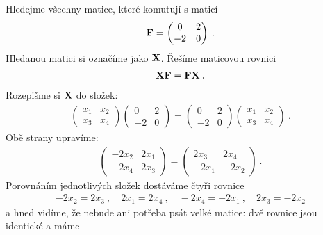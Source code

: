 \begin{example}
    Hledejme všechny matice, které komutují s maticí \begin{align}
        \mathbf{F} = \begin{pmatrix}
            0 & 2 \\ -2 & 0
        \end{pmatrix} \:.
    \end{align}
    Hledanou matici si označíme jako $\mathbf{X}$. Řešíme maticovou rovnici
    \begin{align}
        \mathbf{X} \mathbf{F} = \mathbf{F} \mathbf{X} \:.
    \end{align}
    Rozepišme si $\mathbf{X}$ do složek:
    \begin{align}
        \begin{pmatrix}
            x_1 & x_2 \\ x_3 & x_4
        \end{pmatrix}
        \begin{pmatrix}
            0 & 2 \\ -2 & 0
        \end{pmatrix}
        = 
        \begin{pmatrix}
            0 & 2 \\ -2 & 0
        \end{pmatrix}
        \begin{pmatrix}
            x_1 & x_2 \\ x_3 & x_4
        \end{pmatrix} \:.
    \end{align}
    Obě strany upravíme:
    \begin{align}
        \begin{pmatrix}
            -2x_2 & 2x_1 \\
            -2x_4 & 2x_3
        \end{pmatrix}
        =
        \begin{pmatrix}
            2x_3 & 2x_4 \\
            -2x_1 & -2x_2
        \end{pmatrix} \:.
    \end{align}
    Porovnáním jednotlivých složek dostáváme čtyři rovnice
    \begin{align}
        -2x_2 = 2x_3 \:,\quad 2x_1=2x_4 \:,\quad -2x_4=-2x_1 \:,\quad 2x_3=-2x_2
    \end{align}
    a hned vidíme, že nebude ani potřeba psát velké matice: dvě rovnice jsou identické a máme
    \begin{align}

\end{align}
\end{example}
